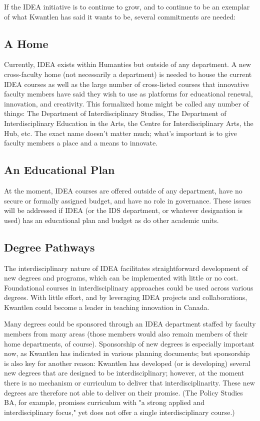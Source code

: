 \documentclass[letterpaper,10pt,headsepline]{scrreprt}
\begin{document}
If the IDEA initiative is to continue to grow, and to continue to be an exemplar of what Kwantlen has said it wants to be, several commitments are needed:

\subsection{A Home}

Currently, IDEA exists within Humanties but outside of any department. A new cross-faculty home (not necessarily a department) is needed to house the current IDEA courses as well as the large number of cross-listed courses that innovative faculty members have said they wish to use as platforms for educational renewal, innovation, and creativity. This formalized home might be called any number of things: The Department of Interdisciplinary Studies, The Department of Interdisciplinary Education in the Arts, the Centre for Interdisciplinary Arts, the Hub, etc. The exact name doesn't matter much; what's important is to give faculty members a place and a means to innovate.

\subsection{An Educational Plan}

At the moment, IDEA courses are offered outside of any department, have no secure or formally assigned budget, and have no role in governance. These issues will be addressed if IDEA (or the IDS department, or whatever designation is used) has an educational plan and budget as do other academic units.

\subsection{Degree Pathways}

The interdisciplinary nature of IDEA facilitates straightforward development of new degrees and programs, which can be implemented with little or no cost. Foundational courses in interdisciplinary approaches could be used across various degrees. With little effort, and by leveraging IDEA projects and collaborations, Kwantlen could become a leader in teaching innovation in Canada.

Many degrees could be sponsored through an IDEA department staffed by faculty members from many areas (those members would also remain members of their home departments, of course). Sponsorship of new degrees is especially important now, as Kwantlen has indicated in various planning documents; but sponsorship is also key for another reason: Kwantlen has developed (or is developing) several new degrees that are designed to be interdisciplinary; however, at the moment there is no mechanism or curriculum to deliver that interdisciplinarity. These new degrees are therefore not able to deliver on their promise. (The Policy Studies BA, for example, promises curriculum with "a strong applied and interdisciplinary focus," yet does not offer a single interdisciplinary course.)
\end{document}
